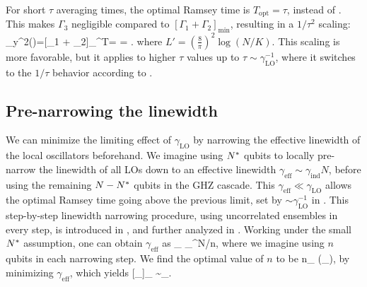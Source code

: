 For short $\tau$ averaging times, the optimal Ramsey time is
$T_\mathrm{opt}=\tau$, instead of . This makes $\Gamma_3$
negligible compared to $[\Gamma_1 + \Gamma_2]_\mathrm{min}$, resulting in a
$1/\tau^2$ scaling:
\bal
	\label{eq:short_tau}
	\sigma_y^2(\tau)=[\Gamma_1 +
	\Gamma_2]_^{T=\tau} = .
\eal
where $L' = \left(\frac{8}{\pi}\right)^2 \log(N/K)$. This scaling is more
favorable, but it applies to higher $\tau$ values up to $\tau \sim
\gamma_\mathrm{LO}^{-1}$, where it switches to the $1/\tau$ behavior according to
.

\subsection{Pre-narrowing the linewidth}
We can minimize the limiting effect of $\gamma_\mathrm{LO}$ by narrowing the
effective linewidth of the local oscillators beforehand. We imagine using $N^\ast$
qubits to locally pre-narrow
the linewidth of all LOs down to an effective linewidth $\gamma_\mathrm{eff} \sim
\gamma_\mathrm{ind}N$, before using the remaining $N-N^\ast$ qubits in the GHZ
cascade.
This $\gamma_\mathrm{eff} \ll \gamma_\mathrm{LO}$ allows the optimal Ramsey time
going above the previous limit, set by $\sim \gamma_\mathrm{LO}^{-1}$ in
.
This step-by-step linewidth narrowing procedure, using uncorrelated ensembles in
every step, is introduced in \cite{Rosenband2013,Borregaard2013}, and
further analyzed in \cite{Kessler2014}. Working under the small $N^\ast$
assumption, one can obtain $\gamma_\mathrm{eff}$ as
\bel
	\gamma_ \approx 
	\gamma_^{N\s/n},
\eel
where we imagine using $n$ qubits in each narrowing step. We find the optimal
value of $n$ to be
\bel
	n_ \approx {}\log(\gamma_\tau),
\eel 
by minimizing $\gamma_\mathrm{eff}$, which yields
\bel
	\label{eq:gamma_m2}
	[\gamma_]_ \sim \gamma_\exp{}.
\eel

